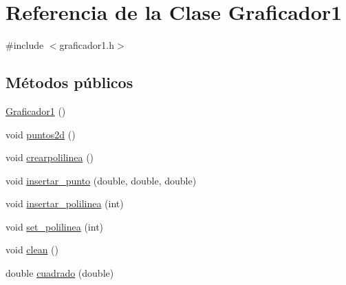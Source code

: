\hypertarget{class_graficador1}{}\section{Referencia de la Clase Graficador1}
\label{class_graficador1}


{\ttfamily \#include $<$graficador1.\+h$>$}

\subsection*{Métodos públicos}
\begin{DoxyCompactItemize}
\item 
\hyperlink{class_graficador1_aad669b9e0784dd67bf7aadf65a657608}{Graficador1} ()
\item 
void \hyperlink{class_graficador1_a5b79063a4630ab7d01cb6e4f9e7b7a1f}{puntos2d} ()
\item 
void \hyperlink{class_graficador1_aa2af594975f59373167af2de434ad665}{crearpolilinea} ()
\item 
void \hyperlink{class_graficador1_afa15e469dd3579558eae1b303180e7bd}{insertar\+\_\+punto} (double, double, double)
\item 
void \hyperlink{class_graficador1_a400a046298f47f30a350d9da3f60c541}{insertar\+\_\+polilinea} (int)
\item 
void \hyperlink{class_graficador1_ae8416d64e9889d4eef20a53bf0251831}{set\+\_\+polilinea} (int)
\item 
void \hyperlink{class_graficador1_a66e079687b749600be62080387a4049c}{clean} ()
\item 
double \hyperlink{class_graficador1_a61617b0f3755ffbb05c07d94515b6185}{cuadrado} (double)
\end{DoxyCompactItemize}
